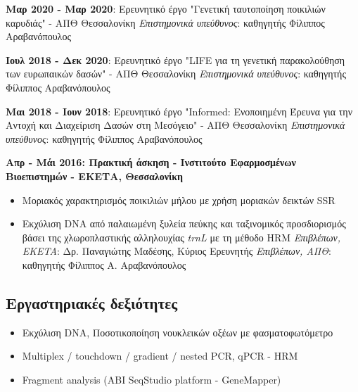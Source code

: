 \documentclass[12pt,]{scrartcl}
\begin{document}
\textbf{Μαρ 2020 - Μαρ 2020}: Ερευνητικό έργο "Γενετική ταυτοποίηση ποικιλιών καρυδιάς" - ΑΠΘ Θεσσαλονίκη
\vspace{2mm}
\newline
\textit{Επιστημονικά υπεύθυνος}: καθηγητής Φίλιππος Αραβανόπουλος

\textbf{Ιουλ 2018 - Δεκ 2020}: Ερευνητικό έργο "LIFE για τη γενετική παρακολούθηση των ευρωπαικών δασών" - ΑΠΘ Θεσσαλονίκη
\vspace{2mm}
\newline
\textit{Επιστημονικά υπεύθυνος}: καθηγητής Φίλιππος Αραβανόπουλος

\textbf{Μαι 2018 - Ιουν 2018}: Ερευνητικό έργο "Informed: Ενοποιημένη Έρευνα για την Αντοχή και Διαχείριση Δασών στη Μεσόγειο" - ΑΠΘ Θεσσαλονίκη
\vspace{2mm}
\newline
\textit{Επιστημονικά υπεύθυνος}: καθηγητής Φίλιππος Αραβανόπουλος

\vspace{3mm}
\textbf{Απρ - Μάι 2016: Πρακτική άσκηση - Ινστιτούτο Εφαρμοσμένων Βιοεπιστημών - ΕΚΕΤΑ, Θεσσαλονίκη}


\vspace{3mm}
\begin{itemize}
\vspace{-3mm}
\setlength\itemsep{-0.6em}
\item Μοριακός χαρακτηρισμός ποικιλιών μήλου με χρήση μοριακών δεικτών SSR 
\item Εκχύλιση DNA από παλαιωμένη ξυλεία πεύκης και ταξινομικός προσδιορισμός βάσει της χλωροπλαστικής αλληλουχίας \textit{trnL} με τη μέθοδο HRM
\vspace{2mm}
\newline
\textit{Επιβλέπων, EKETA}: Δρ. Παναγιώτης Μαδέσης, Κύριος Ερευνητής
\newline
\textit{Επιβλέπων, ΑΠΘ}: καθηγητής Φίλιππος Α. Αραβανόπουλος
\end{itemize}


\subsection{Εργαστηριακές δεξιότητες}\label{lab}
\begin{itemize}
\vspace{-3mm}
\setlength\itemsep{-0.6em}
\item Εκχύλιση DNA, Ποσοτικοποίηση νουκλεικών οξέων με φασματοφωτόμετρο
\item Multiplex / touchdown / gradient / nested PCR, qPCR - HRM
\item Fragment analysis (ABI SeqStudio platform - GeneMapper)
\end{itemize}
\end{document}
